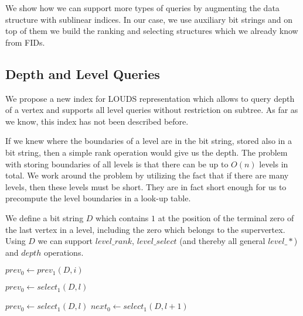 \bigskip

We show how we can support more types of queries by augmenting the data structure with sublinear indices.
In our case, we use auxiliary bit strings and on top of them we build the ranking and selecting structures which we already know from FIDs.

\subsection{Depth and Level Queries}

We propose a new index for LOUDS representation which allows to query depth of a vertex and supports all level queries without restriction on subtree.
As far as we know, this index has not been described before.

If we knew where the boundaries of a level are in the bit string, stored also in a bit string, then a simple rank operation would give us the depth.
The problem with storing boundaries of all levels is that there can be up to $O(n)$ levels in total.
We work around the problem by utilizing the fact that if there are many levels, then these levels must be short.
They are in fact short enough for us to precompute the level boundaries in a look-up table.

We define a bit string $D$ which contains $1$ at the position of the terminal zero of the last vertex in a level, including the zero which belongs to the supervertex.
Using $D$ we can support $level\_rank$, $level\_select$ (and thereby all general $level\_*$) and $depth$ operations.

\begin{algorithmic}
	\State $prev_0 \gets prev_1(D, i)$ 
	\State {}
\EndFunction
\end{algorithmic}

\begin{algorithmic}
	\State $prev_0 \gets select_1(D, l)$ 
	\State {}
\EndFunction
\end{algorithmic}

\begin{algorithmic}
	\State $prev_0 \gets select_1(D, l)$ 
	\State $next_0 \gets select_1(D, l + 1)$ 
	\State {}
\EndFunction
\end{algorithmic}

